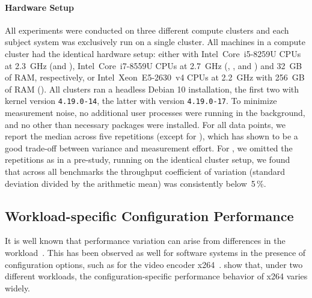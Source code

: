 \paragraph*{Hardware Setup}
All experiments were conducted on three different compute clusters and each subject system was exclusively run on a single cluster. All machines in a compute cluster had the identical hardware setup: either with Intel~Core~i5-8259U CPUs at 2.3~GHz (\jumper and \kanzi),  Intel~Core~i7-8559U CPUs at 2.7~GHz (\dconvert, \batik, and \jadx) and 32~GB of RAM, respectively, or Intel~Xeon~E5-2630~v4 CPUs at 2.2~GHz with 256~GB of RAM (\htwo). All clusters ran a headless Debian 10 installation, the first two with kernel version \mbox{\texttt{4.19.0-14}}, the latter with version \mbox{\texttt{4.19.0-17}}. 
To minimize measurement noise, no additional user processes were running in the background, and no other than necessary packages were installed.	For all data points, we report the median across five repetitions (except for \htwo), which has shown to be a good trade-off between variance and measurement effort. For \htwo, we omitted the repetitions as in a pre-study, running on the identical cluster setup, we found that across all benchmarks the throughput coefficient of variation (standard deviation divided by the arithmetic mean) was consistently below~5\,\%.

\subsection{Workload-specific Configuration Performance}\label{sec:rq1}
It is well known that performance variation can arise from differences in the workload~\cite{benchmarking_book}. 
This has been observed as well for software systems in the presence of configuration options, such as for the video encoder x264~\cite{alves_sampling_2020}. \citeauthor{alves_sampling_2020} show that, under two different workloads, the configuration-specific performance behavior of x264 varies widely. 


